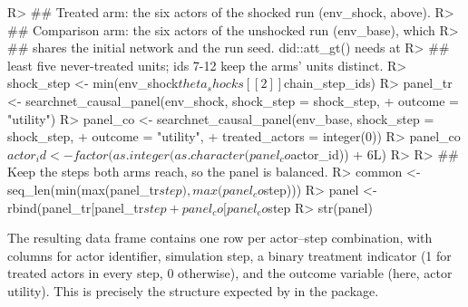 \documentclass[
  article]{jss}
\begin{document}
\begin{CodeChunk}
\begin{CodeInput}
R> ## Treated arm: the six actors of the shocked run (env_shock, above).
R> ## Comparison arm: the six actors of the unshocked run (env_base), which
R> ## shares the initial network and the run seed. did::att_gt() needs at
R> ## least five never-treated units; ids 7-12 keep the arms' units distinct.
R> shock_step <- min(env_shock$theta_shocks[[2]]$chain_step_ids)
R> panel_tr <- searchnet_causal_panel(env_shock, shock_step = shock_step,
+                                    outcome = "utility")
R> panel_co <- searchnet_causal_panel(env_base, shock_step = shock_step,
+                                    outcome = "utility",
+                                    treated_actors = integer(0))
R> panel_co$actor_id <- factor(as.integer(as.character(panel_co$actor_id)) + 6L)
R> 
R> ## Keep the steps both arms reach, so the panel is balanced.
R> common <- seq_len(min(max(panel_tr$step), max(panel_co$step)))
R> panel <- rbind(panel_tr[panel_tr$step %
+                panel_co[panel_co$step %
R> str(panel)
\end{CodeInput}
\end{CodeChunk}

The resulting data frame contains one row per actor--step combination,
with columns for actor identifier, simulation step, a binary treatment
indicator (1 for treated actors in every step, 0 otherwise), and the
outcome variable (here, actor utility). This is precisely the structure
expected by  in the  package.
\end{document}
